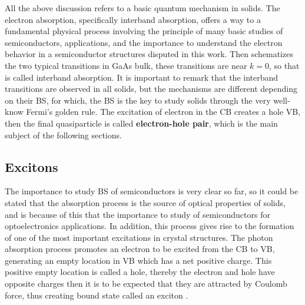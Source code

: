 All the above discussion refers to a basic quantum mechanism in solids. The electron absorption, specifically interband absorption, offers a way to a fundamental physical process  involving the principle of many basic studies of semiconductors, applications, and the importance to understand the electron behavior in a semiconductor structures disputed in this work. Then  schematizes the two typical transitions in GaAs bulk, these transitions are near  $k=0$, so that is called interband absorption. It is important to remark that the interband transitions are observed in all solids, but the mechanisms are different depending on their BS, for which,   the BS is the key to study solids  through the very well-know Fermi's golden rule. The excitation of electron in the CB creates a hole VB, then the  final quasiparticle is called \textbf{electron-hole pair}, which is the main subject of the following sections.


\subsection{Excitons}
\label{subsec:chapter-1-excitons}
\vspace{-10mm}

The importance to study \gls{BS} of semiconductors is very clear so far, so it could be stated that the absorption process is the source of optical properties of solids, and is because of this that the importance to study of semiconductors for optoelectronics applications. In addition, this process gives rise to the formation of one of the most important excitations in crystal structures. The photon absorption process promotes an electron to be excited from the \gls{CB} to \gls{VB}, generating an empty location in \gls{VB} which has a net positive charge. This positive empty location is called a hole, thereby the electron and hole have opposite charges then it is to be expected that they are attracted by Coulomb force, thus
creating bound state called an exciton \cite{leonard2017exciton,tanguy1995optical-dispersion}.


